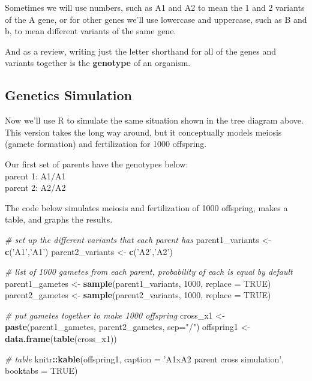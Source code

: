 \documentclass[]{book}
\newenvironment{Shaded}{\begin{snugshade}}{\end{snugshade}}
\newcommand{\KeywordTok}[1]{\textcolor[rgb]{0.13,0.29,0.53}{\textbf{#1}}}
\newcommand{\DataTypeTok}[1]{\textcolor[rgb]{0.13,0.29,0.53}{#1}}
\newcommand{\DecValTok}[1]{\textcolor[rgb]{0.00,0.00,0.81}{#1}}
\newcommand{\StringTok}[1]{\textcolor[rgb]{0.31,0.60,0.02}{#1}}
\newcommand{\CommentTok}[1]{\textcolor[rgb]{0.56,0.35,0.01}{\textit{#1}}}
\newcommand{\OtherTok}[1]{\textcolor[rgb]{0.56,0.35,0.01}{#1}}
\newcommand{\OperatorTok}[1]{\textcolor[rgb]{0.81,0.36,0.00}{\textbf{#1}}}
\newcommand{\NormalTok}[1]{#1}
\theoremstyle{definition}
\theoremstyle{definition}
\theoremstyle{definition}
\theoremstyle{remark}
\begin{document}
Sometimes we will use numbers, such as A1 and A2 to mean the 1 and 2
variants of the A gene, or for other genes we'll use lowercase and
uppercase, such as B and b, to mean different variants of the same gene.

And as a review, writing just the letter shorthand for all of the genes
and variants together is the \textbf{genotype} of an organism.

\subsection{Genetics Simulation}\label{genetics-simulation}

Now we'll use R to simulate the same situation shown in the tree diagram
above. This version takes the long way around, but it conceptually
models meiosis (gamete formation) and fertilization for 1000 offspring.

Our first set of parents have the genotypes below:\\
parent 1: A1/A1\\
parent 2: A2/A2

The code below simulates meiosis and fertilization of 1000 offspring,
makes a table, and graphs the results.

\begin{Shaded}
\begin{Highlighting}[]
\CommentTok{# set up the different variants that each parent has}
\NormalTok{parent1_variants <-}\StringTok{ }\KeywordTok{c}\NormalTok{(}\StringTok{'A1'}\NormalTok{,}\StringTok{'A1'}\NormalTok{)}
\NormalTok{parent2_variants <-}\StringTok{ }\KeywordTok{c}\NormalTok{(}\StringTok{'A2'}\NormalTok{,}\StringTok{'A2'}\NormalTok{)}

\CommentTok{# list of 1000 gametes from each parent, probability of each is equal by default}
\NormalTok{parent1_gametes <-}\StringTok{ }\KeywordTok{sample}\NormalTok{(parent1_variants, }\DecValTok{1000}\NormalTok{, }\DataTypeTok{replace =} \OtherTok{TRUE}\NormalTok{)}
\NormalTok{parent2_gametes <-}\StringTok{ }\KeywordTok{sample}\NormalTok{(parent2_variants, }\DecValTok{1000}\NormalTok{, }\DataTypeTok{replace =} \OtherTok{TRUE}\NormalTok{)}

\CommentTok{# put gametes together to make 1000 offspring}
\NormalTok{cross_x1 <-}\StringTok{ }\KeywordTok{paste}\NormalTok{(parent1_gametes, parent2_gametes, }\DataTypeTok{sep=}\StringTok{"/"}\NormalTok{)}
\NormalTok{offspring1 <-}\StringTok{ }\KeywordTok{data.frame}\NormalTok{(}\KeywordTok{table}\NormalTok{(cross_x1))}

\CommentTok{# table}
\NormalTok{knitr}\OperatorTok{::}\KeywordTok{kable}\NormalTok{(offspring1, }\DataTypeTok{caption =} \StringTok{'A1xA2 parent cross simulation'}\NormalTok{, }\DataTypeTok{booktabs =} \OtherTok{TRUE}\NormalTok{)}
\end{Highlighting}
\end{Shaded}
\end{document}
